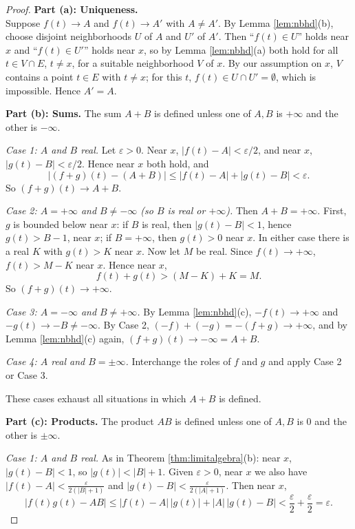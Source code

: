 \documentclass{article}
\theoremstyle{mythm}
\begin{document}
\begin{proof}
\textbf{Part (a): Uniqueness.}\\
Suppose $f(t) \to A$ and $f(t) \to A'$ with $A \neq A'$. By Lemma \ref{lem:nbhd}(b), choose disjoint neighborhoods $U$ of $A$ and $U'$ of $A'$. Then ``$f(t) \in U$'' holds near $x$ and ``$f(t) \in U'$'' holds near $x$, so by Lemma \ref{lem:nbhd}(a) both hold for all $t \in V \cap E$, $t \neq x$, for a suitable neighborhood $V$ of $x$. By our assumption on $x$, $V$ contains a point $t \in E$ with $t \neq x$; for this $t$, $f(t) \in U \cap U' = \emptyset$, which is impossible. Hence $A' = A$.

\textbf{Part (b): Sums.} The sum $A + B$ is defined unless one of $A, B$ is $+\infty$ and the other is $-\infty$.

\textit{Case 1: $A$ and $B$ real.} Let $\varepsilon > 0$. Near $x$, $|f(t) - A| < \varepsilon/2$, and near $x$, $|g(t) - B| < \varepsilon/2$. Hence near $x$ both hold, and
\[
|(f+g)(t) - (A+B)| \leq |f(t) - A| + |g(t) - B| < \varepsilon.
\]
So $(f+g)(t) \to A + B$.

\textit{Case 2: $A = +\infty$ and $B \neq -\infty$ (so $B$ is real or $+\infty$).} Then $A + B = +\infty$. First, $g$ is bounded below near $x$: if $B$ is real, then $|g(t) - B| < 1$, hence $g(t) > B - 1$, near $x$; if $B = +\infty$, then $g(t) > 0$ near $x$. In either case there is a real $K$ with $g(t) > K$ near $x$. Now let $M$ be real. Since $f(t) \to +\infty$, $f(t) > M - K$ near $x$. Hence near $x$,
\[
f(t) + g(t) > (M - K) + K = M.
\]
So $(f+g)(t) \to +\infty$.

\textit{Case 3: $A = -\infty$ and $B \neq +\infty$.} By Lemma \ref{lem:nbhd}(c), $-f(t) \to +\infty$ and $-g(t) \to -B \neq -\infty$. By Case 2, $(-f) + (-g) = -(f+g) \to +\infty$, and by Lemma \ref{lem:nbhd}(c) again, $(f+g)(t) \to -\infty = A + B$.

\textit{Case 4: $A$ real and $B = \pm\infty$.} Interchange the roles of $f$ and $g$ and apply Case 2 or Case 3.

These cases exhaust all situations in which $A + B$ is defined.

\textbf{Part (c): Products.} The product $AB$ is defined unless one of $A, B$ is $0$ and the other is $\pm\infty$.

\textit{Case 1: $A$ and $B$ real.} As in Theorem \ref{thm:limitalgebra}(b): near $x$, $|g(t) - B| < 1$, so $|g(t)| < |B| + 1$. Given $\varepsilon > 0$, near $x$ we also have $|f(t) - A| < \frac{\varepsilon}{2(|B|+1)}$ and $|g(t) - B| < \frac{\varepsilon}{2(|A|+1)}$. Then near $x$,
\[
|f(t)g(t) - AB| \leq |f(t) - A|\,|g(t)| + |A|\,|g(t) - B| < \frac{\varepsilon}{2} + \frac{\varepsilon}{2} = \varepsilon.
\]


\end{proof}
\end{document}
